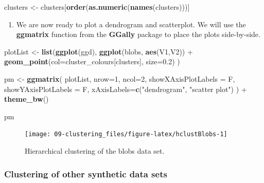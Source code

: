 \documentclass[]{book}
\newenvironment{Shaded}{\begin{snugshade}}{\end{snugshade}}
\newcommand{\KeywordTok}[1]{\textcolor[rgb]{0.13,0.29,0.53}{\textbf{{#1}}}}
\newcommand{\DataTypeTok}[1]{\textcolor[rgb]{0.13,0.29,0.53}{{#1}}}
\newcommand{\DecValTok}[1]{\textcolor[rgb]{0.00,0.00,0.81}{{#1}}}
\newcommand{\FloatTok}[1]{\textcolor[rgb]{0.00,0.00,0.81}{{#1}}}
\newcommand{\StringTok}[1]{\textcolor[rgb]{0.31,0.60,0.02}{{#1}}}
\newcommand{\NormalTok}[1]{{#1}}
\providecommand{\tightlist}{%
  \setlength{\itemsep}{0pt}\setlength{\parskip}{0pt}}
\theoremstyle{definition}
\theoremstyle{definition}
\theoremstyle{definition}
\theoremstyle{remark}
\begin{document}
\begin{Shaded}
\begin{Highlighting}[]
\NormalTok{clusters <-}\StringTok{ }\NormalTok{clusters[}\KeywordTok{order}\NormalTok{(}\KeywordTok{as.numeric}\NormalTok{(}\KeywordTok{names}\NormalTok{(clusters)))]}
\end{Highlighting}
\end{Shaded}

\begin{enumerate}
\def\labelenumi{\arabic{enumi}.}
\setcounter{enumi}{11}
\tightlist
\item
  We are now ready to plot a dendrogram and scatterplot. We will use the
  \textbf{ggmatrix} function from the \textbf{GGally} package to place
  the plots side-by-side.
\end{enumerate}

\begin{Shaded}
\begin{Highlighting}[]
\NormalTok{plotList <-}\StringTok{ }\KeywordTok{list}\NormalTok{(}\KeywordTok{ggplot}\NormalTok{(ggd),}
                 \KeywordTok{ggplot}\NormalTok{(blobs, }\KeywordTok{aes}\NormalTok{(V1,V2)) +}\StringTok{ }
\StringTok{                   }\KeywordTok{geom_point}\NormalTok{(}\DataTypeTok{col=}\NormalTok{cluster_colours[clusters], }\DataTypeTok{size=}\FloatTok{0.2}\NormalTok{)}
                 \NormalTok{)}

\NormalTok{pm <-}\StringTok{ }\KeywordTok{ggmatrix}\NormalTok{(}
  \NormalTok{plotList, }\DataTypeTok{nrow=}\DecValTok{1}\NormalTok{, }\DataTypeTok{ncol=}\DecValTok{2}\NormalTok{, }\DataTypeTok{showXAxisPlotLabels =} \NormalTok{F, }\DataTypeTok{showYAxisPlotLabels =} \NormalTok{F, }
  \DataTypeTok{xAxisLabels=}\KeywordTok{c}\NormalTok{(}\StringTok{"dendrogram"}\NormalTok{, }\StringTok{"scatter plot"}\NormalTok{)}
\NormalTok{) +}\StringTok{ }\KeywordTok{theme_bw}\NormalTok{()}

\NormalTok{pm}
\end{Highlighting}
\end{Shaded}

\begin{figure}

{\centering \texttt{[image: 09-clustering\_files/figure-latex/hclustBlobs-1]} 

}

\caption{Hierarchical clustering of the blobs data set.}\label{fig:hclustBlobs}
\end{figure}

\subsubsection{Clustering of other synthetic data
sets}\label{clustering-of-other-synthetic-data-sets}
\end{document}
